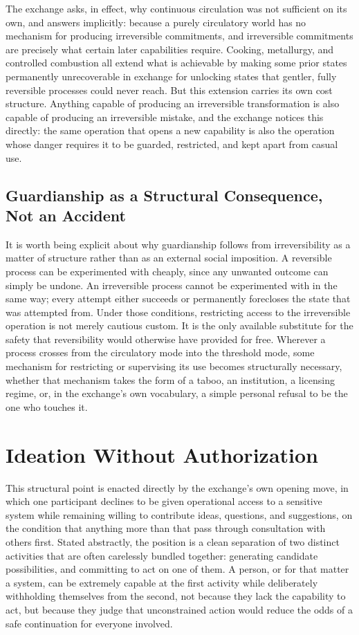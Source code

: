 \documentclass[11pt]{article}
\begin{document}
The exchange asks, in effect, why continuous circulation was not sufficient on its own, and answers implicitly: because a purely circulatory world has no mechanism for producing irreversible commitments, and irreversible commitments are precisely what certain later capabilities require. Cooking, metallurgy, and controlled combustion all extend what is achievable by making some prior states permanently unrecoverable in exchange for unlocking states that gentler, fully reversible processes could never reach. But this extension carries its own cost structure. Anything capable of producing an irreversible transformation is also capable of producing an irreversible mistake, and the exchange notices this directly: the same operation that opens a new capability is also the operation whose danger requires it to be guarded, restricted, and kept apart from casual use.

\subsection{Guardianship as a Structural Consequence, Not an Accident}

It is worth being explicit about why guardianship follows from irreversibility as a matter of structure rather than as an external social imposition. A reversible process can be experimented with cheaply, since any unwanted outcome can simply be undone. An irreversible process cannot be experimented with in the same way; every attempt either succeeds or permanently forecloses the state that was attempted from. Under those conditions, restricting access to the irreversible operation is not merely cautious custom. It is the only available substitute for the safety that reversibility would otherwise have provided for free. Wherever a process crosses from the circulatory mode into the threshold mode, some mechanism for restricting or supervising its use becomes structurally necessary, whether that mechanism takes the form of a taboo, an institution, a licensing regime, or, in the exchange's own vocabulary, a simple personal refusal to be the one who touches it.

\section{Ideation Without Authorization}

This structural point is enacted directly by the exchange's own opening move, in which one participant declines to be given operational access to a sensitive system while remaining willing to contribute ideas, questions, and suggestions, on the condition that anything more than that pass through consultation with others first. Stated abstractly, the position is a clean separation of two distinct activities that are often carelessly bundled together: generating candidate possibilities, and committing to act on one of them. A person, or for that matter a system, can be extremely capable at the first activity while deliberately withholding themselves from the second, not because they lack the capability to act, but because they judge that unconstrained action would reduce the odds of a safe continuation for everyone involved.
\end{document}
